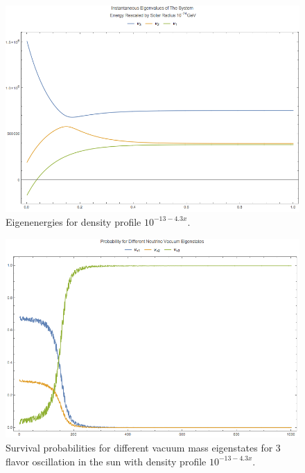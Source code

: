 \documentclass[letterpaper,12pt,english]{sphinxmanual}
\begin{document}
\begin{figure}[htbp]
\centering
\capstart

\includegraphics{numericalMSW3Flavor-minus13-Inst-Eigen-Energies.png}
\caption{Eigenenergies for density profile \(10^{-13 - 4.3 x}\).}\end{figure}
\begin{figure}[htbp]
\centering
\capstart

\includegraphics{numericalMSW3Flavor-vac-eigen-prob.png}
\caption{Survival probabilities for different vacuum mass eigenstates for 3 flavor oscillation in the sun with density profile \(10^{-13 - 4.3 x}\).}\end{figure}
\end{document}
